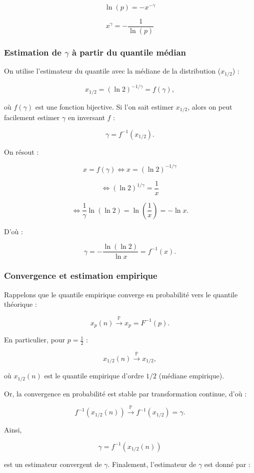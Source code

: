 \documentclass{article}
\begin{document}
\[
\ln(p) = -x^{-\gamma}
\]

\[
x^{\gamma} = -\frac{1}{\ln(p)}
\]

\subsubsection{Estimation de \(\gamma\) à partir du quantile médian}

On utilise l'estimateur du quantile avec la médiane de la distribution (\(x_{1/2}\)) :

\[
x_{1/2} = (\ln 2)^{-1/\gamma} = f(\gamma),
\]

où \(f(\gamma)\) est une fonction bijective.  
Si l'on sait estimer \(x_{1/2}\), alors on peut facilement estimer \(\gamma\) en inversant \(f\) :

\[
\gamma = f^{-1}(x_{1/2}).
\]

On résout :

\[
x = f(\gamma) \iff x = (\ln 2)^{-1/\gamma}
\]

\[
\iff (\ln 2)^{1/\gamma} = \frac{1}{x}
\]

\[
\iff \frac{1}{\gamma} \ln (\ln 2) = \ln \left(\frac{1}{x}\right) = -\ln x.
\]

D'où :

\[
\gamma = -\frac{\ln (\ln 2)}{\ln x} = f^{-1}(x).
\]

\subsubsection{Convergence et estimation empirique}

Rappelons que le quantile empirique converge en probabilité vers le quantile théorique :

\[
x_p(n) \xrightarrow{\mathbb{P}} x_p = F^{-1}(p).
\]

En particulier, pour \(p = \frac{1}{2}\) :

\[
x_{1/2}(n) \xrightarrow{\mathbb{P}} x_{1/2},
\]

où \(x_{1/2}(n)\) est le quantile empirique d'ordre \(1/2\) (médiane empirique).  

Or, la convergence en probabilité est stable par transformation continue, d'où :

\[
f^{-1}(x_{1/2}(n)) \xrightarrow{\mathbb{P}} f^{-1}(x_{1/2}) = \gamma.
\]

Ainsi, 

\[
\gamma = f^{-1}(x_{1/2}(n))
\]

est un estimateur convergent de \(\gamma\).  
Finalement, l'estimateur de \(\gamma\) est donné par :
\end{document}
